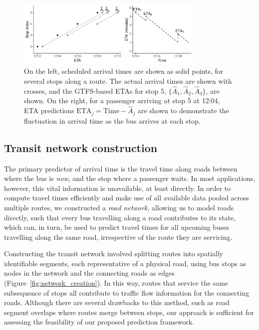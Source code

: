 \begin{figure}[tb]
    \centering
    \includegraphics[width=0.8\textwidth]{figures/02_gtfs_delays.pdf}
    \caption{
        On the left, scheduled arrival times are shown as solid points,
        for several stops along a route. The actual arrival times
        are shown with crosses,
        and the GTFS-based ETAs for stop 5, $\{\hat A_1, \hat A_2, \hat A_3\}$, are shown.
        On the right,
        for a passenger arriving at stop 5 at 12:04,
        ETA predictions
        $\mathrm{ETA}_j = \mathrm{Time} - \hat A_j$ are shown
        to demonstrate the fluctuation in
        arrival time as the bus arrives at each stop.
    }
    \label{fig:gtfs-delays}
\end{figure}



\subsection{Transit network construction}
\label{sec:network_build}

The primary predictor of arrival time is 
the travel time along roads between where the bus is \emph{now},
and the stop where a passenger waits.
In most applications, however, this vital information is unavailable, at least directly.
In order to compute travel times efficiently
and make use of all available data pooled across multiple routes,
we constructed a \emph{road network},
allowing us to model roads directly,
such that every bus travelling along a road contributes to its state,
which can, in turn, be used to predict travel times for all upcoming buses 
travelling along the same road,
irrespective of the route they are servicing.


Constructing the transit network involved splitting routes
into spatially identifiable segments,
each representative of a physical road,
using bus stops as nodes in the network
and the connecting roads as edges
(Figure~\ref{fig:network_creation}).
In this way, routes that service the same subsequence of stops
all contribute to traffic flow information for the connecting roads.
Although there are several drawbacks to this method,
such as road segment overlaps where routes merge between stops,
our approach is sufficient for assessing the \rt 
feasibility of our proposed prediction framework.



